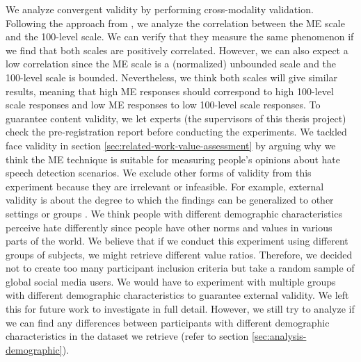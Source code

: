 %
We analyze convergent validity by performing cross-modality validation.
%
Following the approach from \citet{roitero2018fine}, we analyze the correlation between the ME scale and the 100-level scale.
%
We can verify that they measure the same phenomenon if we find that both scales are positively correlated.
%
However, we can also expect a low correlation since the ME scale is a (normalized) unbounded scale and the 100-level scale is bounded.
%
Nevertheless, we think both scales will give similar results, meaning that high ME responses should correspond to high 100-level scale responses and low ME responses to low 100-level scale responses.
%
To guarantee content validity, we let experts (the supervisors of this thesis project) check the pre-registration report before conducting the experiments.
%
We tackled face validity in section \ref{sec:related-work-value-assessment} by arguing why we think the ME technique is suitable for measuring people's opinions about hate speech detection scenarios.
%
We exclude other forms of validity from this experiment because they are irrelevant or infeasible.
%
For example, external validity is about the degree to which the findings can be generalized to other settings or groups \citep{fitzner2007reliability}.
%
We think people with different demographic characteristics perceive hate differently since people have other norms and values in various parts of the world.
%
We believe that if we conduct this experiment using different groups of subjects, we might retrieve different value ratios.
%
Therefore, we decided not to create too many participant inclusion criteria but take a random sample of global social media users.
%
We would have to experiment with multiple groups with different demographic characteristics to guarantee external validity.
%
We left this for future work to investigate in full detail.
%
However, we still try to analyze if we can find any differences between participants with different demographic characteristics in the dataset we retrieve (refer to section \ref{sec:analysis-demographic}).

